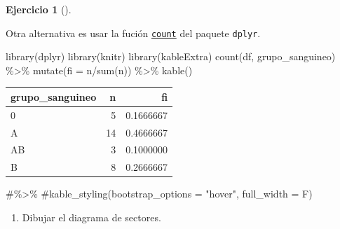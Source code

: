 \documentclass[
  a4paper,
]{scrreport}
\newenvironment{Shaded}{\begin{snugshade}}{\end{snugshade}}
\newcommand{\AttributeTok}[1]{\textcolor[rgb]{0.40,0.45,0.13}{#1}}
\newcommand{\CommentTok}[1]{\textcolor[rgb]{0.37,0.37,0.37}{#1}}
\newcommand{\FunctionTok}[1]{\textcolor[rgb]{0.28,0.35,0.67}{#1}}
\newcommand{\NormalTok}[1]{\textcolor[rgb]{0.00,0.23,0.31}{#1}}
\newcommand{\SpecialCharTok}[1]{\textcolor[rgb]{0.37,0.37,0.37}{#1}}
\providecommand{\tightlist}{%
  \setlength{\itemsep}{0pt}\setlength{\parskip}{0pt}}\usepackage{longtable,booktabs,array}
\theoremstyle{definition}
\newtheorem{exercise}{Ejercicio}[chapter]
\theoremstyle{remark}
\begin{document}
\begin{exercise}[]
\begin{tcolorbox}
Otra alternativa es usar la fución
\href{https://aprendeconalf.es/manual-r/06-preprocesamiento.html\#conteo-del-n\%C3\%BAmero-de-observaciones}{\texttt{count}}
del paquete \texttt{dplyr}.

\begin{Shaded}
\begin{Highlighting}[]
\FunctionTok{library}\NormalTok{(dplyr)}
\FunctionTok{library}\NormalTok{(knitr)}
\FunctionTok{library}\NormalTok{(kableExtra)}
\FunctionTok{count}\NormalTok{(df, grupo\_sanguineo) }\SpecialCharTok{\%\textgreater{}\%} 
    \FunctionTok{mutate}\NormalTok{(}\AttributeTok{fi =}\NormalTok{ n}\SpecialCharTok{/}\FunctionTok{sum}\NormalTok{(n)) }\SpecialCharTok{\%\textgreater{}\%}
    \FunctionTok{kable}\NormalTok{() }
\end{Highlighting}
\end{Shaded}

\begin{tabular}{l|r|r}
\hline
grupo\_sanguineo & n & fi\\
\hline
0 & 5 & 0.1666667\\
\hline
A & 14 & 0.4666667\\
\hline
AB & 3 & 0.1000000\\
\hline
B & 8 & 0.2666667\\
\hline
\end{tabular}

\begin{Shaded}
\begin{Highlighting}[]
    \CommentTok{\#\%\textgreater{}\%}
    \CommentTok{\#kable\_styling(bootstrap\_options = "hover", full\_width = F)}
\end{Highlighting}
\end{Shaded}

\end{tcolorbox}

\begin{enumerate}
\def\labelenumi{\alph{enumi}.}
\setcounter{enumi}{2}
\tightlist
\item
  Dibujar el diagrama de sectores.
\end{enumerate}

\begin{tcolorbox}[enhanced jigsaw, rightrule=.15mm, toptitle=1mm, colbacktitle=quarto-callout-tip-color!10!white, titlerule=0mm, colback=white, leftrule=.75mm, bottomtitle=1mm, colframe=quarto-callout-tip-color-frame, breakable, title=\textcolor{quarto-callout-tip-color}{\faLightbulb}\hspace{0.5em}{Solución 1}, arc=.35mm, coltitle=black, opacityback=0, bottomrule=.15mm, opacitybacktitle=0.6, left=2mm, toprule=.15mm]


\end{tcolorbox}
\end{exercise}
\end{document}
